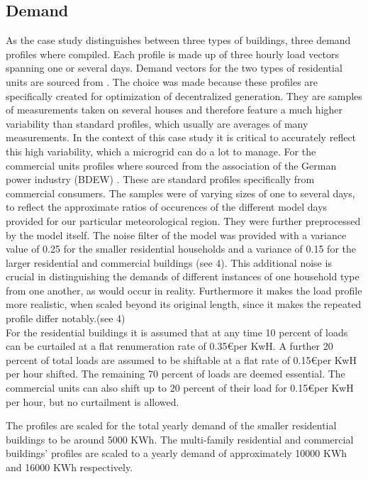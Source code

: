 \documentclass[
	11pt,								%
	DIV10,								%
	a4paper,         					%
	oneside,							%
	headheight=20pt,					%
	footheight=20pt,					%
    parskip=full,						%
    listof=totoc,						%
	bibliography=totoc,					%
	index=totoc,						%
]{scrartcl}
\begin{document}
\subsection{Demand}
As the case study distinguishes between three types of buildings, three demand profiles where compiled. Each profile is made up of three hourly load vectors spanning one or several days. Demand vectors for the two types of residential units are sourced from \cite{ReferenzlastprofileUndMehrfamilien2008}. The choice was made because these profiles are specifically created for optimization of decentralized generation. They are samples of measurements taken on several houses and therefore feature a much higher variability than standard profiles, which usually are averages of many measurements. In the context of this case study it is critical to accurately reflect this high variability, which a microgrid can do a lot to manage. For the commercial units profiles where sourced from the association of the German power industry (BDEW) \cite{fuenfgeldAnwendungRepraesentativenVDEWLastprofile2000}\cite{StandardlastprofileStrom2017}. These are standard profiles specifically from commercial consumers. The samples were of varying sizes of one to several days, to reflect the approximate ratios of occurences of the different model days provided for our particular meteorological region. They were further preprocessed by the model itself. The noise filter of the model was provided with a variance value of 0.25 for the smaller residential households and a variance of 0.15 for the larger residential and commercial buildings (see 4). This additional noise is crucial in distinguishing the demands of different instances of one household type from one another, as would occur in reality. Furthermore it makes the load profile more realistic, when scaled beyond its original length, since it makes the repeated profile differ notably.(see 4)
\\
For the residential buildings it is assumed that at any time 10 percent of loads can be curtailed at a flat renumeration rate of 0.35\euro per KwH. A further 20 percent of total loads are assumed to be shiftable at a flat rate of 0.15\euro per KwH per hour shifted. The remaining 70 percent of loads are deemed essential. The commercial units can also shift up to 20 percent of their load for 0.15\euro per KwH per hour, but no curtailment is allowed.

The profiles are scaled for the total yearly demand of the smaller residential buildings to be around 5000 KWh. The multi-family residential and commercial buildings' profiles are scaled to a yearly demand of approximately 10000 KWh and 16000 KWh respectively. 
\end{document}
